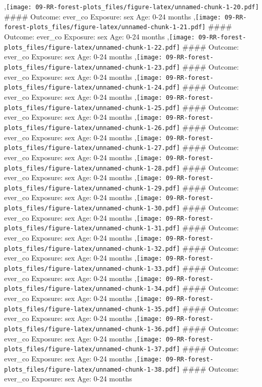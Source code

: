 \documentclass[
  9pt,
]{book}
\begin{document}
,\texttt{[image: 09-RR-forest-plots\_files/figure-latex/unnamed-chunk-1-20.pdf]}
\#\#\#\# Outcome: ever\_co Exposure: sex Age: 0-24 months
,\texttt{[image: 09-RR-forest-plots\_files/figure-latex/unnamed-chunk-1-21.pdf]}
\#\#\#\# Outcome: ever\_co Exposure: sex Age: 0-24 months
,\texttt{[image: 09-RR-forest-plots\_files/figure-latex/unnamed-chunk-1-22.pdf]}
\#\#\#\# Outcome: ever\_co Exposure: sex Age: 0-24 months
,\texttt{[image: 09-RR-forest-plots\_files/figure-latex/unnamed-chunk-1-23.pdf]}
\#\#\#\# Outcome: ever\_co Exposure: sex Age: 0-24 months
,\texttt{[image: 09-RR-forest-plots\_files/figure-latex/unnamed-chunk-1-24.pdf]}
\#\#\#\# Outcome: ever\_co Exposure: sex Age: 0-24 months
,\texttt{[image: 09-RR-forest-plots\_files/figure-latex/unnamed-chunk-1-25.pdf]}
\#\#\#\# Outcome: ever\_co Exposure: sex Age: 0-24 months
,\texttt{[image: 09-RR-forest-plots\_files/figure-latex/unnamed-chunk-1-26.pdf]}
\#\#\#\# Outcome: ever\_co Exposure: sex Age: 0-24 months
,\texttt{[image: 09-RR-forest-plots\_files/figure-latex/unnamed-chunk-1-27.pdf]}
\#\#\#\# Outcome: ever\_co Exposure: sex Age: 0-24 months
,\texttt{[image: 09-RR-forest-plots\_files/figure-latex/unnamed-chunk-1-28.pdf]}
\#\#\#\# Outcome: ever\_co Exposure: sex Age: 0-24 months
,\texttt{[image: 09-RR-forest-plots\_files/figure-latex/unnamed-chunk-1-29.pdf]}
\#\#\#\# Outcome: ever\_co Exposure: sex Age: 0-24 months
,\texttt{[image: 09-RR-forest-plots\_files/figure-latex/unnamed-chunk-1-30.pdf]}
\#\#\#\# Outcome: ever\_co Exposure: sex Age: 0-24 months
,\texttt{[image: 09-RR-forest-plots\_files/figure-latex/unnamed-chunk-1-31.pdf]}
\#\#\#\# Outcome: ever\_co Exposure: sex Age: 0-24 months
,\texttt{[image: 09-RR-forest-plots\_files/figure-latex/unnamed-chunk-1-32.pdf]}
\#\#\#\# Outcome: ever\_co Exposure: sex Age: 0-24 months
,\texttt{[image: 09-RR-forest-plots\_files/figure-latex/unnamed-chunk-1-33.pdf]}
\#\#\#\# Outcome: ever\_co Exposure: sex Age: 0-24 months
,\texttt{[image: 09-RR-forest-plots\_files/figure-latex/unnamed-chunk-1-34.pdf]}
\#\#\#\# Outcome: ever\_co Exposure: sex Age: 0-24 months
,\texttt{[image: 09-RR-forest-plots\_files/figure-latex/unnamed-chunk-1-35.pdf]}
\#\#\#\# Outcome: ever\_co Exposure: sex Age: 0-24 months
,\texttt{[image: 09-RR-forest-plots\_files/figure-latex/unnamed-chunk-1-36.pdf]}
\#\#\#\# Outcome: ever\_co Exposure: sex Age: 0-24 months
,\texttt{[image: 09-RR-forest-plots\_files/figure-latex/unnamed-chunk-1-37.pdf]}
\#\#\#\# Outcome: ever\_co Exposure: sex Age: 0-24 months
,\texttt{[image: 09-RR-forest-plots\_files/figure-latex/unnamed-chunk-1-38.pdf]}
\#\#\#\# Outcome: ever\_co Exposure: sex Age: 0-24 months
\end{document}
